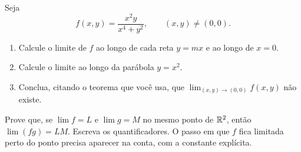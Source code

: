 \documentclass[11pt,a4paper]{article}
\begin{document}
\begin{exercicio}
Seja
\[
f(x,y)=\frac{x^2 y}{x^4+y^2},\qquad (x,y)\neq(0,0).
\]
\begin{enumerate}[label=\alph*)]
\item Calcule o limite de $f$ ao longo de cada reta $y=mx$ e ao longo de $x=0$.
\item Calcule o limite ao longo da parábola $y=x^2$.
\item Conclua, citando o teorema que você usa, que $\lim_{(x,y)\to(0,0)} f(x,y)$ não existe.
\end{enumerate}
\end{exercicio}

\begin{exercicio}
Prove que, se $\lim f=L$ e $\lim g=M$ no mesmo ponto de $\mathbb{R}^2$, então $\lim(fg)=LM$. Escreva os quantificadores. O passo em que $f$ fica limitada perto do ponto precisa aparecer na conta, com a constante explícita.
\end{exercicio}
\end{document}
